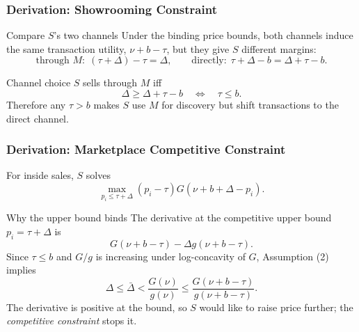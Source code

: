 \begin{frame}
  \frametitle{Derivation: Showrooming Constraint}
  \hypertarget{mp_showrooming_deriv}{}
  \footnotesize

  \begin{block}{Compare $S$'s two channels}
    Under the binding price bounds, both channels induce the same transaction
    utility, $\nu+b-\tau$, but they give $S$ different margins:
    \[
      \text{through }M:\;(\tau+\Delta)-\tau=\Delta,
      \qquad
      \text{directly}:\;\tau+\Delta-b=\Delta+\tau-b.
    \]
  \end{block}

  \begin{alertblock}{Channel choice}
    $S$ sells through $M$ iff
    \[
      \Delta \geq \Delta+\tau-b
      \quad\Longleftrightarrow\quad
      \tau\leq b.
    \]
    Therefore any $\tau>b$ makes $S$ use $M$ for discovery but shift
    transactions to the direct channel.
  \end{alertblock}

  \hyperlink{mp_showrooming_src}{}
\end{frame}

\begin{frame}
  \frametitle{Derivation: Marketplace Competitive Constraint}
  \hypertarget{mp_competitive_deriv}{}
  \footnotesize

  For inside sales, $S$ solves
  \[
    \max_{p_i\leq\tau+\Delta}(p_i-\tau)G(\nu+b+\Delta-p_i).
  \]

  \begin{block}{Why the upper bound binds}
    The derivative at the competitive upper bound $p_i=\tau+\Delta$ is
    \[
      G(\nu+b-\tau)-\Delta g(\nu+b-\tau).
    \]
    Since $\tau\leq b$ and $G/g$ is increasing under log-concavity of $G$,
    Assumption (2) implies
    \[
      \Delta\leq\bar{\Delta}<\frac{G(\nu)}{g(\nu)}
      \leq
      \frac{G(\nu+b-\tau)}{g(\nu+b-\tau)}.
    \]
    The derivative is positive at the bound, so $S$ would like to raise
    price further; the \textit{competitive constraint} stops it.
  \end{block}

  \hyperlink{mp_competitive_src}{}
\end{frame}

